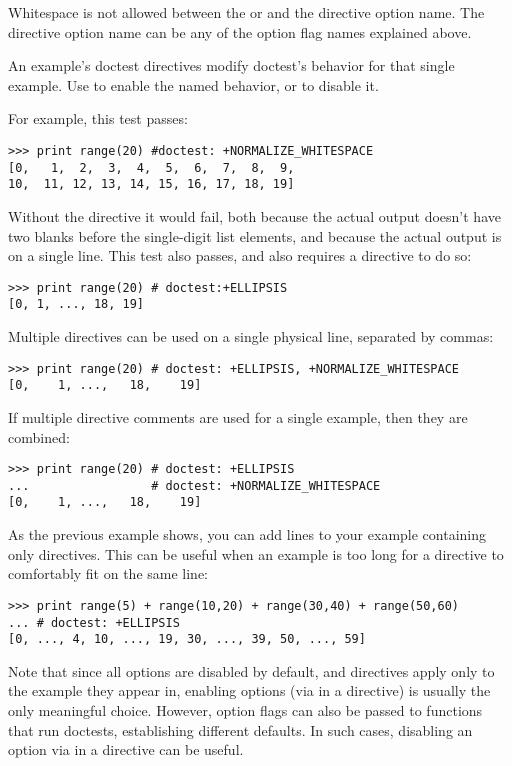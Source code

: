 Whitespace is not allowed between the \code{+} or \code{-} and the
directive option name.  The directive option name can be any of the
option flag names explained above.

An example's doctest directives modify doctest's behavior for that
single example.  Use \code{+} to enable the named behavior, or
\code{-} to disable it.

For example, this test passes:

\begin{verbatim}
>>> print range(20) #doctest: +NORMALIZE_WHITESPACE
[0,   1,  2,  3,  4,  5,  6,  7,  8,  9,
10,  11, 12, 13, 14, 15, 16, 17, 18, 19]
\end{verbatim}

Without the directive it would fail, both because the actual output
doesn't have two blanks before the single-digit list elements, and
because the actual output is on a single line.  This test also passes,
and also requires a directive to do so:

\begin{verbatim}
>>> print range(20) # doctest:+ELLIPSIS
[0, 1, ..., 18, 19]
\end{verbatim}

Multiple directives can be used on a single physical line, separated
by commas:

\begin{verbatim}
>>> print range(20) # doctest: +ELLIPSIS, +NORMALIZE_WHITESPACE
[0,    1, ...,   18,    19]
\end{verbatim}

If multiple directive comments are used for a single example, then
they are combined:

\begin{verbatim}
>>> print range(20) # doctest: +ELLIPSIS
...                 # doctest: +NORMALIZE_WHITESPACE
[0,    1, ...,   18,    19]
\end{verbatim}

As the previous example shows, you can add  lines to your
example containing only directives.  This can be useful when an
example is too long for a directive to comfortably fit on the same
line:

\begin{verbatim}
>>> print range(5) + range(10,20) + range(30,40) + range(50,60)
... # doctest: +ELLIPSIS
[0, ..., 4, 10, ..., 19, 30, ..., 39, 50, ..., 59]
\end{verbatim}

Note that since all options are disabled by default, and directives apply
only to the example they appear in, enabling options (via \code{+} in a
directive) is usually the only meaningful choice.  However, option flags
can also be passed to functions that run doctests, establishing different
defaults.  In such cases, disabling an option via \code{-} in a directive
can be useful.

